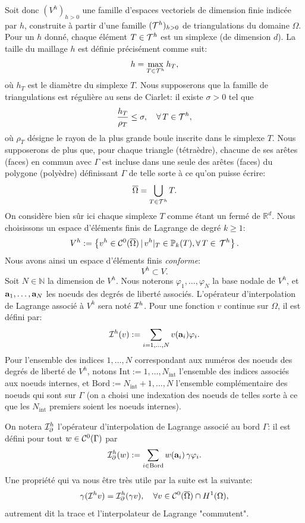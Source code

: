 \documentclass[11pt]{book}
\def\a{{\bf a}}
\newcommand{\caI}{{\cal I}}
\newcommand{\caC}{{\cal C}}
\newcommand{\caT}{{\cal T}}
\newcommand{\R}{\mathbb{R}}
\newcommand{\N}{\mathbb{N}}
\newcommand{\PP}{\mathbb{P}}
\begin{document}
Soit donc $(V^h)_{h>0}$ une famille d'espaces vectoriels de dimension finie
 \cite{brenner-scott-07, ciarlet-91, ern-guermond-04} indicée par $h$, construite à partir d'une famille $({\cal  T}^h)_{h>0}$ de triangulations du domaine $\Omega$. Pour un $h$ donné, chaque élément $T \in {\cal T}^h$ est un simplexe (de dimension $d$). %
La taille du maillage $h$ est définie précisément comme suit: 
$$h = \max_{T \in  {\cal T}^h} h_T,$$
où $h_T$ est le diamètre du simplexe $T$. 
Nous supposerons que la famille de triangulations est régulière au sens de Ciarlet:
il existe $\sigma>0$ tel que 
$$\frac{h_T}{\rho_T} \le \sigma, \quad \forall \, T \in {\cal T}^h,$$
où $\rho_T$ désigne le rayon de la plus grande boule inscrite dans le simplexe $T$.
Nous supposerons de plus que, pour chaque triangle (tétraèdre), chacune de ses arêtes (faces) en commun avec $\Gamma$ est incluse dans une seule des arêtes (faces) du polygone (polyèdre) définissant $\Gamma$ de telle sorte à ce qu'on puisse écrire:
\[
\overline{\Omega} = \bigcup_{T \in {\cal T}^h} T.
\]
On considère bien sûr ici chaque simplexe $T$ comme étant un fermé de $\R^d$.
Nous choisissons un espace d'éléments finis de Lagrange de degré  $k\geq1$:
\begin{equation} \label{defvh}
V^h := \left\{ v^h \in \caC^0(\overline\Omega) \, | \,
 v^h|_{T} \in \PP_k (T), \forall \,T \in \,{\cal T}^h
\right\}.
\end{equation}
Nous avons ainsi un espace d'éléments finis \emph{conforme}:
\[
 V^h \subset V.
\]
Soit $N \in \N$ la dimension de $V^h$. Nous noterons $\varphi_1,\ldots,\varphi_N$ la base nodale de $V^h$, et $\a_1,\ldots,\a_N$ les noeuds des degrés de liberté associés. %
L'opérateur d'interpolation de Lagrange associé à $V^h$ sera noté $\caI^h$. Pour une fonction $v$ continue sur $\Omega$, il est défini par:
\[
\caI^h (v) := \sum_{i=1,\ldots,N} v(\a_i) \varphi_i.
\]
Pour l'ensemble des indices $1,\ldots,N$ correspondant aux numéros des noeuds des degrés de liberté de $V^h$, notons $\mathrm{Int} := 1,\ldots,N_{\mathrm{int}}$ l'ensemble des indices associés aux noeuds internes, et $\mathrm{Bord} := N_{\mathrm{int}}+1,\ldots,N$ l'ensemble complémentaire des noeuds qui sont sur $\Gamma$ (on a choisi une indexation des noeuds de telles sorte à ce que les $N_{\mathrm{int}}$ premiers soient les noeuds internes).

On notera $\caI^h_\partial$ l'opérateur d'interpolation de Lagrange associé au bord $\Gamma$: il est défini pour tout $w \in \caC^0(\Gamma)$ par
\[
\caI^h_\partial (w) := \sum_{i \in \mathrm{Bord}} w(\a_i) \, \gamma \varphi_i.
\]
Une propriété qui va nous être très utile par la suite est la suivante:
\begin{equation}
\label{propinterptrace}
\gamma (\caI^h v ) = \caI^h_\partial ( \gamma v), \quad \forall v \in \caC^0(\overline{\Omega}) \cap H^1(\Omega),
\end{equation}
autrement dit la trace et l'interpolateur de Lagrange "commutent". 
\end{document}
